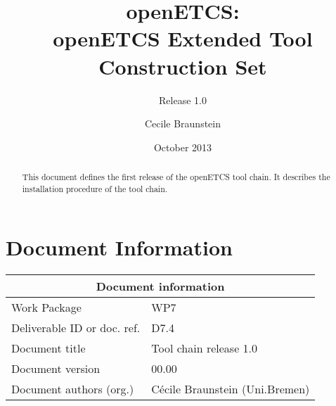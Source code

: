 \documentclass{openetcs_report}
\begin{document}
\frontmatter
{}




\title{openETCS:\\ openETCS Extended Tool Construction Set }

\subtitle{Release 1.0}

\date{October 2013}


\author{Cecile Braunstein}







\begin{abstract}
This document defines the first release of the openETCS tool chain. It
describes the installation procedure of the tool chain.
\end{abstract}

\maketitle
\tableofcontents

\newpage

\chapter{Document Information}
\begin{tabular}{|p{4.4cm}|p{8.7cm}|}
\hline
\multicolumn{2}{|c|}{Document information} \\
\hline
Work Package &  WP7  \\
Deliverable ID or doc. ref. & D7.4\\
\hline
Document title & Tool chain release 1.0 \\
Document version & 00.00 \\
Document authors (org.)  & Cécile Braunstein  (Uni.Bremen)  \\
\hline
\end{tabular}
\end{document}
